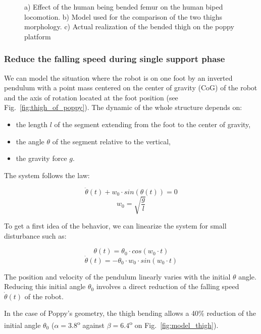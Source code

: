 \begin{figure}
\centering
    \hfil
    \hfil
    \caption{ a) Effect of the human being bended femur on the human biped locomotion. b) Model used for the comparison of the two thighs morphology. c) Actual realization of the bended thigh on the poppy platform}
    \label{fig:poppy_thigh}
\end{figure}

\subsubsection{Reduce the falling speed during single support phase} %
\label{ssub:recude_the_lateral_falling_speed}

We can model the situation where the robot is on one foot by an inverted pendulum with a point mass centered on the center of gravity (CoG) of the robot and the axis of rotation located at the foot position (see Fig.~\ref{fig:thigh_of_poppy}). The dynamic of the whole structure depends on:

\begin{itemize}
    \item the length $l$ of the segment extending from the foot to the center of gravity,
    \item the angle $\theta$ of the segment relative to the vertical,
    \item the gravity force $g$.
\end{itemize}

The system follows the law:

$$\ddot{\theta}(t) + w_0 \cdot sin(\theta(t)) = 0$$
$$w_0 = \sqrt{\frac{g}{l}}$$

To get a first idea of the behavior, we can linearize the system for small disturbance such as:

$$\theta(t) = \theta_0 \cdot cos(w_0\cdot t)$$
$$\dot{\theta}(t) = -\theta_0 \cdot w_0 \cdot sin(w_0\cdot t)$$

The position and velocity of the pendulum linearly varies with the initial $\theta$ angle. Reducing
this initial angle $\theta_0$ involves a direct reduction of the falling speed $\dot{\theta}(t)$ of
the robot.

In the case of Poppy's geometry, the thigh bending allows a 40\% reduction of the initial
angle $\theta_0$ ($\alpha = 3.8$\textsuperscript{o} against $ \beta = 6.4$\textsuperscript{o} on
Fig.~\ref{fig:model_thigh}).

